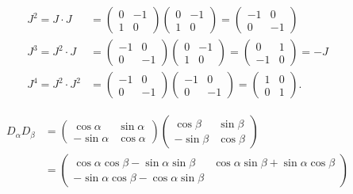 \begin{loesung}
\begin{teilaufgaben}
\item
\begin{align*}
J^2=J\cdot J
&=
\begin{pmatrix}0&-1\\1&0\end{pmatrix}
\begin{pmatrix}0&-1\\1&0\end{pmatrix}
=
\begin{pmatrix}-1&0\\0&-1\end{pmatrix}\\
J^3=J^2\cdot J&=
\begin{pmatrix}-1&0\\0&-1\end{pmatrix}
\begin{pmatrix}0&-1\\1&0\end{pmatrix}
=
\begin{pmatrix}0&1\\-1&0\end{pmatrix}=-J
\\
J^4=J^2\cdot J^2
&=
\begin{pmatrix}-1&0\\0&-1\end{pmatrix}
\begin{pmatrix}-1&0\\0&-1\end{pmatrix}
=
\begin{pmatrix}1&0\\0&1\end{pmatrix}.
\end{align*}
\item
\begin{align*}
D_\alpha
D_\beta
&=
\begin{pmatrix}\cos\alpha&\sin\alpha\\
-\sin\alpha&\cos\alpha\end{pmatrix}
\begin{pmatrix}\cos\beta&\sin\beta\\
-\sin\beta&\cos\beta\end{pmatrix}
\\
&=
\begin{pmatrix}
\cos\alpha\cos\beta-\sin\alpha\sin\beta
	&\cos\alpha\sin\beta+\sin\alpha\cos\beta\\
-\sin\alpha\cos\beta-\cos\alpha\sin\beta

\end{pmatrix}
\end{align*}
\end{teilaufgaben}
\end{loesung}
